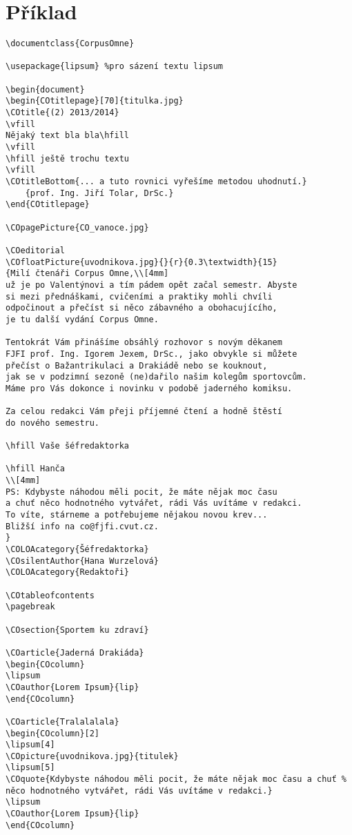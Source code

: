 \documentclass{article}
\begin{document}
\section{Příklad}
%
\begin{verbatim}
\documentclass{CorpusOmne}

\usepackage{lipsum} %pro sázení textu lipsum

\begin{document}
\begin{COtitlepage}[70]{titulka.jpg}
\COtitle{(2) 2013/2014}
\vfill
Nějaký text bla bla\hfill
\vfill
\hfill ještě trochu textu
\vfill
\COtitleBottom{... a tuto rovnici vyřešíme metodou uhodnutí.}
	{prof. Ing. Jiří Tolar, DrSc.}
\end{COtitlepage}

\COpagePicture{CO_vanoce.jpg}

\COeditorial
\COfloatPicture{uvodnikova.jpg}{}{r}{0.3\textwidth}{15}
{Milí čtenáři Corpus Omne,\\[4mm]
už je po Valentýnovi a tím pádem opět začal semestr. Abyste 
si mezi přednáškami, cvičeními a praktiky mohli chvíli 
odpočinout a přečíst si něco zábavného a obohacujícího, 
je tu další vydání Corpus Omne.

Tentokrát Vám přinášíme obsáhlý rozhovor s novým děkanem 
FJFI prof. Ing. Igorem Jexem, DrSc., jako obvykle si můžete 
přečíst o Bažantrikulaci a Drakiádě nebo se kouknout, 
jak se v podzimní sezoně (ne)dařilo našim kolegům sportovcům. 
Máme pro Vás dokonce i novinku v podobě jaderného komiksu.

Za celou redakci Vám přeji příjemné čtení a hodně štěstí 
do nového semestru.

\hfill Vaše šéfredaktorka

\hfill Hanča
\\[4mm]
PS: Kdybyste náhodou měli pocit, že máte nějak moc času 
a chuť něco hodnotného vytvářet, rádi Vás uvítáme v redakci. 
To víte, stárneme a potřebujeme nějakou novou krev... 
Bližší info na co@fjfi.cvut.cz.
}
\COLOAcategory{Šéfredaktorka}
\COsilentAuthor{Hana Wurzelová}
\COLOAcategory{Redaktoři}

\COtableofcontents
\pagebreak

\COsection{Sportem ku zdraví}

\COarticle{Jaderná Drakiáda}
\begin{COcolumn}
\lipsum
\COauthor{Lorem Ipsum}{lip}
\end{COcolumn}

\COarticle{Tralalalala}
\begin{COcolumn}[2]
\lipsum[4]
\COpicture{uvodnikova.jpg}{titulek}
\lipsum[5]
\COquote{Kdybyste náhodou měli pocit, že máte nějak moc času a chuť %
něco hodnotného vytvářet, rádi Vás uvítáme v redakci.}
\lipsum
\COauthor{Lorem Ipsum}{lip}
\end{COcolumn}


\end{verbatim}
\end{document}
